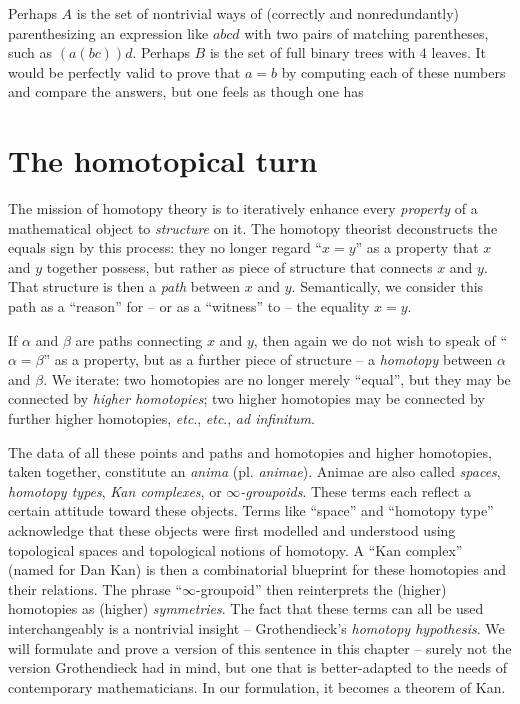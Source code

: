 Perhaps $A$ is the set of nontrivial ways of (correctly and nonredundantly) parenthesizing an expression like $abcd$ with two pairs of matching parentheses,
such as $(a(bc))d$.
Perhaps $B$ is the set of full binary trees with $4$ leaves.
It would be perfectly valid to prove that $a=b$ by computing each of these numbers and compare the answers, but
one feels as though one has 

\section*{The homotopical turn}%
\label{sec:homotopical}

The mission of homotopy theory is to iteratively enhance every \emph{property} of a mathematical object to \emph{structure} on it.
The homotopy theorist deconstructs the equals sign by this process:
they no longer regard \enquote{$x = y$} as a property that $x$ and $y$ together possess,
but rather as piece of structure that connects $x$ and $y$.
That structure is then a \emph{path} between $x$ and $y$.
Semantically, we consider this path as a \enquote{reason} for -- or as a \enquote{witness} to -- the equality $x = y$.

If $\alpha$ and $\beta$ are paths connecting $x$ and $y$,
then again we do not wish to speak of \enquote{$\alpha = \beta$} as a property,
but as a further piece of structure -- a \emph{homotopy} between $\alpha$ and $\beta$.
We iterate: two homotopies are no longer merely \enquote{equal}, but they may be connected by \emph{higher homotopies};
two higher homotopies may be connected by further higher homotopies, \emph{etc}., \emph{etc}., \emph{ad infinitum}.

The data of all these points and paths and homotopies and higher homotopies, taken together, constitute an \emph{anima} (pl. \emph{animae}).
Animae are also called \emph{spaces}, \emph{homotopy types}, \emph{Kan complexes}, or \emph{$\infty$-groupoids}.
These terms each reflect a certain attitude toward these objects.
Terms like \enquote{space} and \enquote{homotopy type} acknowledge that these objects were first modelled and understood using topological spaces and topological notions of homotopy.
A \enquote{Kan complex} (named for Dan Kan) is then a combinatorial blueprint for these homotopies and their relations.
The phrase \enquote{$\infty$-groupoid} then reinterprets the (higher) homotopies as (higher) \emph{symmetries}.
The fact that these terms can all be used interchangeably is a nontrivial insight -- Grothendieck's \emph{homotopy hypothesis}.
We will formulate and prove a version of this sentence in this chapter -- surely not the version Grothendieck had in mind,
but one that is better-adapted to the needs of contemporary mathematicians.
In our formulation, it becomes a theorem of Kan.


